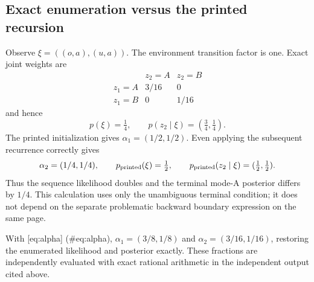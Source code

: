 \documentclass[10pt]{article}
\begin{document}
\subsection*{Exact enumeration versus the printed recursion}
Observe \(\xi=((o,a),(u,a))\). The environment transition factor is one. Exact joint weights are \[\begin{array}{c|cc}
 &z_2=A&z_2=B\\ \hline
z_1=A&3/16&0\\
z_1=B&0&1/16
\end{array}\] and hence \[p(\xi)=\tfrac14,\qquad
p(z_2\mid\xi)=(\tfrac34,\tfrac14).\] The printed initialization gives \(\alpha_1=(1/2,1/2)\). Even applying the subsequent recurrence correctly gives \[\alpha_2=(1/4,1/4),\qquad
p_{\rm printed}(\xi)=\tfrac12,\qquad
p_{\rm printed}(z_2\mid\xi)=(\tfrac12,\tfrac12).\] Thus the sequence likelihood doubles and the terminal mode-A posterior differs by \(1/4\). This calculation uses only the unambiguous terminal condition; it does not depend on the separate problematic backward boundary expression on the same page.\par
With [eq:alpha] (\#eq:alpha), \(\alpha_1=(3/8,1/8)\) and \(\alpha_2=(3/16,1/16)\), restoring the enumerated likelihood and posterior exactly. These fractions are independently evaluated with exact rational arithmetic in the independent output cited above.\par
\end{document}
